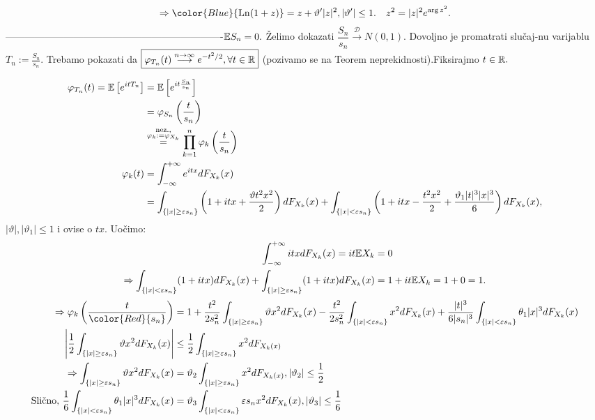 \documentclass{article}
\newcommand{\Ln}{\operatorname{Ln}}
\begin{document}
 \[\Rightarrow{\color{Blue}{\Ln (1+z)}}=z+\vartheta'|z|^2,|\vartheta'|\le 1.\quad z^2=|z|^2e^{\arg z^2}.\] -------------------------------------------------------------------\newline\newline \(\Bbb ES_n=0.\) Želimo dokazati \(\dfrac{S_n}{s_n}\overset{\mathcal D}{\longrightarrow}N(0,1).\) Dovoljno je promatrati slučaj-\newline nu varijablu \(T_n:=\frac{S_n}{s_n}.\) Trebamo pokazati da \(\boxed{\varphi_{T_n}(t)\overset{n\to\infty}{\longrightarrow} e^{-t^2/2},\forall t\in\Bbb R}\) (pozivamo se na Teorem neprekidnosti).\newline Fiksirajmo \(t\in\Bbb R.\) \begin{flushleft}\[\begin{aligned}\varphi_{T_n}(t)=\Bbb E\left[e^{itT_n}\right]&=\Bbb E\left[e^{it\frac{S_n}{s_n}}\right]\\&=\varphi_{S_n}\left(\frac{t}{s_n}\right)\\&\overset{\substack{\text{nez.,}\\\varphi_k:=\varphi_{X_k}}}{=}\prod_{k=1}^n\varphi_k\left(\frac{t}{s_n}\right)\\\varphi_k(t)&=\int_{-\infty}^{+\infty}e^{itx}dF_{X_k}(x)\\&=\int_{\left\{|x|\ge\varepsilon s_n\right\}}\left(1+itx+\frac{\vartheta t^2x^2}2\right)dF_{X_k}(x)+\int_{\left\{|x|<\varepsilon s_n\right\}}\left(1+itx-\frac{t^2x^2}2+\frac{\vartheta_1|t|^3|x|^3}6\right)dF_{X_k}(x),\end{aligned}\] \(|\vartheta|,|\vartheta_1|\le 1\) i ovise o \(tx.\)  Uočimo: \[\begin{aligned}\int_{-\infty}^{+\infty}itxdF_{X_k}(x)=it\Bbb EX_k&=0\\\Rightarrow\int_{\left\{|x|<\varepsilon s_n\right\}}(1+itx)dF_{X_k}(x)+\int_{\left\{|x|\ge\varepsilon s_n\right\}}(1+itx)dF_{X_k}(x)&=1+it\Bbb EX_k=1+0=1.\end{aligned}\] \[\begin{aligned}\Rightarrow\varphi_k\left(\frac{t}{{\color{Red}{s_n}}}\right)&=1+\frac{t^2}{2s_n^2}\int_{\left\{|x|\ge\varepsilon s_n\right\}}\vartheta x^2dF_{X_k}(x)-\frac{t^2}{2s_n^2}\int_{\left\{|x|<\varepsilon s_n\right\}}x^2dF_{X_k}(x)+\frac{|t|^3}{6|s_n|^3}\int_{\left\{|x|<\varepsilon s_n\right\}}\theta_1|x|^3dF_{X_k}(x)\\\left|\frac12\int_{\left\{|x|\ge\varepsilon s_n\right\}}\vartheta x^2dF_{X_k}(x)\right|&\le\frac12\int_{\left\{|x|\ge\varepsilon s_n\right\}}x^2dF_{X_k(x)}\\\Rightarrow\int_{\left\{|x|\ge\varepsilon s_n\right\}}\vartheta x^2dF_{X_k}(x)&=\vartheta_2\int_{\left\{|x|\ge\varepsilon s_n\right\}}x^2dF_{X_k(x)},|\vartheta_2|\le\frac12\\\text{Slično, }\frac16\int_{\left\{|x|<\varepsilon s_n\right\}}\theta_1|x|^3dF_{X_k}(x)&=\vartheta_3\int_{\left\{|x|<\varepsilon s_n\right\}}\varepsilon s_nx^2dF_{X_k}(x),|\vartheta_3|\le\frac16\end{aligned}\]\end{flushleft}
\end{document}
